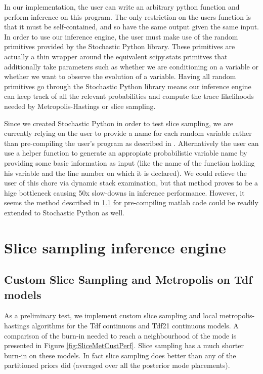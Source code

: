 In our implementation, the user can write an arbitrary python function and perform inference on this program. The only restriction on the users function is that it must be self-contained, and so have the same output given the same input. In order to use our inference engine, the user must make use of the random primitives provided by the Stochastic Python library. These primitives are actually a thin wrapper around the equivalent scipy.stats primitves that additionally take parameters such as whether we are conditioning on a variable or whether we want to observe the evolution of a variable. Having all random primitives go through the Stochastic Python library means our inference engine can keep track of all the relevant probabilities and compute the trace likelihoods needed by Metropolis-Hastings or slice sampling.

Since we created Stochastic Python in order to test slice sampling, we are currently relying on the user to provide a name for each random variable rather than pre-compiling the user's program as described in . Alternatively the user can use a helper function to generate an appropiate  probabilistic variable name by providing some basic information as input (like the name of the function holding his variable and the line number on which it is declared). We could relieve the user of this chore via dynamic stack examination, but that method proves to be a hige bottleneck causing 50x slow-downs in inference performance. However, it seems the method described in \ref{} for pre-compiling matlab code could be readily extended to Stochastic Python as well. 

\section{Slice sampling inference engine}
\subsection{Custom Slice Sampling and Metropolis on Tdf models}

As a preliminary test, we implement custom slice sampling and local metropolis-hastings algorithms for the Tdf continuous and Tdf21 continuous models. A comparison of the burn-in needed to reach a neighbourhood of the mode is presented in Figure \ref{fig:SliceMetCustPerf}. Slice sampling has a much shorter burn-in on these models. In fact slice sampling does better than any of the partitioned priors did (averaged over all the posterior mode placements).

